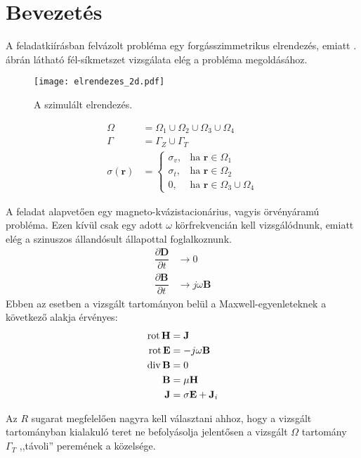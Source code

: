 \section{Bevezetés}
    A feladatkiírásban felvázolt probléma egy forgásszimmetrikus elrendezés, emiatt . ábrán látható fél-síkmetszet vizsgálata elég a probléma megoldásához.

    \begin{wrapfigure}{L}{0.3\textwidth}
        \centering
        \texttt{[image: elrendezes\_2d.pdf]}
        \caption{A szimulált elrendezés.}
        \label{fig:elrendezes_2d}
    \end{wrapfigure}

    \begin{align}
        \Omega &= \Omega_1 \cup \Omega_2 \cup \Omega_3 \cup \Omega_4 \\
        \Gamma &= \Gamma_Z \cup \Gamma_T \\
        \sigma(\mathbf{r}) &=
            \begin{cases}
                \sigma_v, & \text{ha } \mathbf{r} \in \Omega_1\\
                \sigma_t, & \text{ha } \mathbf{r} \in \Omega_2\\
                0, & \text{ha } \mathbf{r} \in \Omega_3 \cup \Omega_4
            \end{cases}
    \end{align}

    A feladat alapvetően egy magneto-kvázistacionárius, vagyis örvényáramú probléma. Ezen kívül csak egy adott $\omega$ körfrekvencián kell vizsgálódnunk, emiatt elég a szinuszos állandósult állapottal foglalkoznunk.
    \begin{align}
        \dfrac{\partial \mathbf{D}}{\partial t} &\longrightarrow 0\\
        \dfrac{\partial \mathbf{B}}{\partial t} &\longrightarrow j\omega\mathbf{B}
    \end{align}
    Ebben az esetben a vizsgált tartományon belül a Maxwell-egyenleteknek a következő alakja érvényes:
    \begin{align}
        \operatorname{rot} \mathbf{H} &= \mathbf{J} \\
        \operatorname{rot} \mathbf{E} &= -j\omega\mathbf{B}\\
        \operatorname{div} \mathbf{B} &= 0\\
        \mathbf{B} &= \mu\mathbf{H}\\
        \mathbf{J} &= \sigma \mathbf{E} + \mathbf{J}_i
    \end{align}

    Az $R$ sugarat megfelelően nagyra kell választani ahhoz, hogy a vizsgált tartományban kialakuló teret ne befolyásolja jelentősen a vizsgált $\Omega$ tartomány $\Gamma_T$ ,,távoli'' peremének a közelsége.
    
    \lipsum[1]